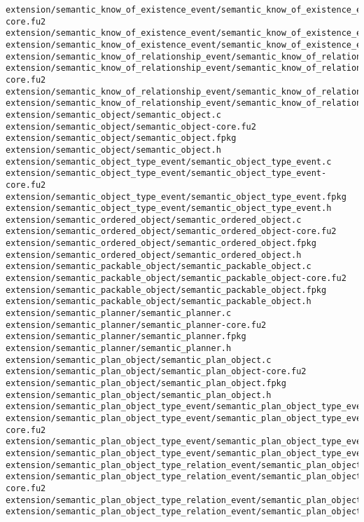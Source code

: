 \begin{lstlisting}
extension/semantic_know_of_existence_event/semantic_know_of_existence_event-core.fu2
extension/semantic_know_of_existence_event/semantic_know_of_existence_event.fpkg
extension/semantic_know_of_existence_event/semantic_know_of_existence_event.h
extension/semantic_know_of_relationship_event/semantic_know_of_relationship_event.c
extension/semantic_know_of_relationship_event/semantic_know_of_relationship_event-core.fu2
extension/semantic_know_of_relationship_event/semantic_know_of_relationship_event.fpkg
extension/semantic_know_of_relationship_event/semantic_know_of_relationship_event.h
extension/semantic_object/semantic_object.c
extension/semantic_object/semantic_object-core.fu2
extension/semantic_object/semantic_object.fpkg
extension/semantic_object/semantic_object.h
extension/semantic_object_type_event/semantic_object_type_event.c
extension/semantic_object_type_event/semantic_object_type_event-core.fu2
extension/semantic_object_type_event/semantic_object_type_event.fpkg
extension/semantic_object_type_event/semantic_object_type_event.h
extension/semantic_ordered_object/semantic_ordered_object.c
extension/semantic_ordered_object/semantic_ordered_object-core.fu2
extension/semantic_ordered_object/semantic_ordered_object.fpkg
extension/semantic_ordered_object/semantic_ordered_object.h
extension/semantic_packable_object/semantic_packable_object.c
extension/semantic_packable_object/semantic_packable_object-core.fu2
extension/semantic_packable_object/semantic_packable_object.fpkg
extension/semantic_packable_object/semantic_packable_object.h
extension/semantic_planner/semantic_planner.c
extension/semantic_planner/semantic_planner-core.fu2
extension/semantic_planner/semantic_planner.fpkg
extension/semantic_planner/semantic_planner.h
extension/semantic_plan_object/semantic_plan_object.c
extension/semantic_plan_object/semantic_plan_object-core.fu2
extension/semantic_plan_object/semantic_plan_object.fpkg
extension/semantic_plan_object/semantic_plan_object.h
extension/semantic_plan_object_type_event/semantic_plan_object_type_event.c
extension/semantic_plan_object_type_event/semantic_plan_object_type_event-core.fu2
extension/semantic_plan_object_type_event/semantic_plan_object_type_event.fpkg
extension/semantic_plan_object_type_event/semantic_plan_object_type_event.h
extension/semantic_plan_object_type_relation_event/semantic_plan_object_type_relation_event.c
extension/semantic_plan_object_type_relation_event/semantic_plan_object_type_relation_event-core.fu2
extension/semantic_plan_object_type_relation_event/semantic_plan_object_type_relation_event.fpkg
extension/semantic_plan_object_type_relation_event/semantic_plan_object_type_relation_event.h

\end{lstlisting}
